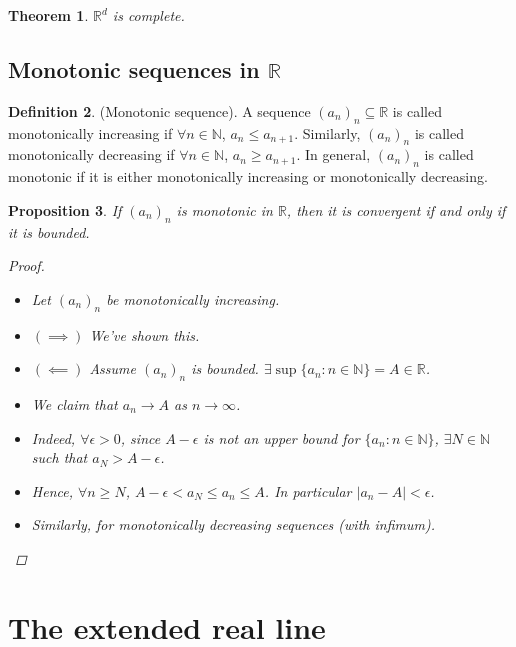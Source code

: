 \documentclass[10pt]{article}
\newcommand{\N}{\mathbb{N}}
\newcommand{\R}{\mathbb{R}}
\newtheorem{theorem}{Theorem}[section]
\newtheorem{proposition}[theorem]{Proposition}
\theoremstyle{definition}
\newtheorem{definition}[theorem]{Definition}
\theoremstyle{remark}
\begin{document}
\begin{theorem}
    $\R^d$ is complete.
\end{theorem}

\subsection{Monotonic sequences in $\R$}

\begin{definition}
    (Monotonic sequence).
    A sequence $(a_n)_n \subseteq \R$ is called monotonically increasing if $\forall n \in \N$, $a_n \leq a_{n+1}$.
    Similarly, $(a_n)_n$ is called monotonically decreasing if $\forall n \in \N$, $a_n \geq a_{n+1}$.
    In general, $(a_n)_n$ is called monotonic if it is either monotonically increasing or monotonically decreasing.
\end{definition}

\begin{proposition}
    If $(a_n)_n$ is monotonic in $\R$, then it is convergent if and only if it is bounded.
    \begin{proof}
        \hfill
        \begin{itemize}
            \item Let $(a_n)_n$ be monotonically increasing.
            \item $(\implies)$ We've shown this.
            \item $(\impliedby)$ Assume $(a_n)_n$ is bounded. $\exists \sup\{a_n : n \in \N\} = A \in \R$.
            \item We claim that $a_n \to A$ as $n \to \infty$.
            \item Indeed, $\forall \epsilon > 0$, since $A - \epsilon$ is not an upper bound for $\{a_n : n \in \N\}$, $\exists N \in \N$ such that $a_N > A - \epsilon$.
            \item Hence, $\forall n \geq N$, $A - \epsilon < a_N \leq a_n \leq A$. In particular $|a_n - A| < \epsilon$.
            \item Similarly, for monotonically decreasing sequences (with infimum).
        \end{itemize}
    \end{proof}
\end{proposition}

\newpage

\section{The extended real line}
\end{document}
